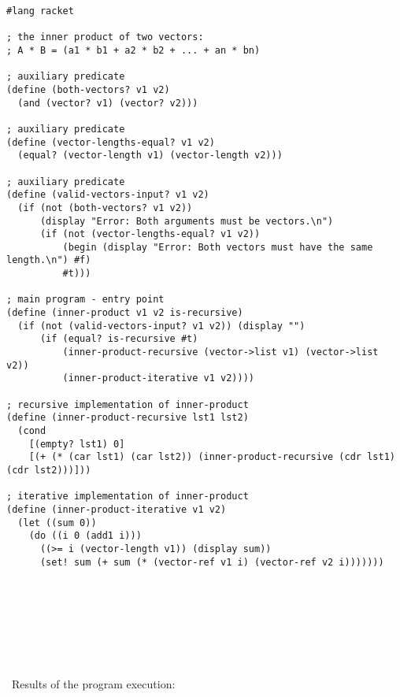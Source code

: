 \documentclass{article}
\begin{document}
\begin{verbatim} 
#lang racket

; the inner product of two vectors:
; A * B = (a1 * b1 + a2 * b2 + ... + an * bn)

; auxiliary predicate
(define (both-vectors? v1 v2)
  (and (vector? v1) (vector? v2)))

; auxiliary predicate
(define (vector-lengths-equal? v1 v2)
  (equal? (vector-length v1) (vector-length v2)))

; auxiliary predicate
(define (valid-vectors-input? v1 v2)
  (if (not (both-vectors? v1 v2))
      (display "Error: Both arguments must be vectors.\n")
      (if (not (vector-lengths-equal? v1 v2))
          (begin (display "Error: Both vectors must have the same length.\n") #f)
          #t)))

; main program - entry point
(define (inner-product v1 v2 is-recursive)
  (if (not (valid-vectors-input? v1 v2)) (display "")
      (if (equal? is-recursive #t)
          (inner-product-recursive (vector->list v1) (vector->list v2))
          (inner-product-iterative v1 v2))))

; recursive implementation of inner-product
(define (inner-product-recursive lst1 lst2)
  (cond
    [(empty? lst1) 0]
    [(+ (* (car lst1) (car lst2)) (inner-product-recursive (cdr lst1) (cdr lst2)))]))
  
; iterative implementation of inner-product
(define (inner-product-iterative v1 v2)
  (let ((sum 0))
    (do ((i 0 (add1 i)))
      ((>= i (vector-length v1)) (display sum))
      (set! sum (+ sum (* (vector-ref v1 i) (vector-ref v2 i)))))))
\end{verbatim}	

\paragraph{}\
\paragraph{}\
\paragraph{}\
\paragraph{}\
	Results of the program execution:
	
\begin{verbatim} 

\end{verbatim}
\end{document}

